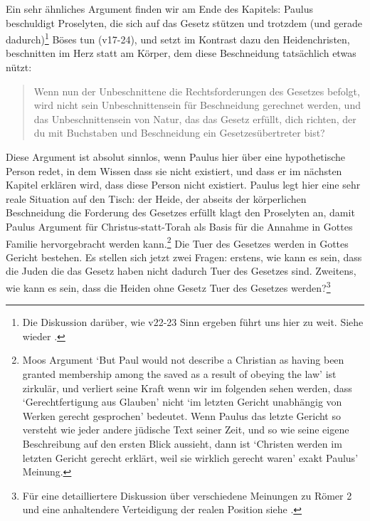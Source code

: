 Ein sehr ähnliches Argument finden wir am Ende des Kapitels:
Paulus beschuldigt Proselyten, die sich auf das Gesetz stützen und trotzdem (und gerade dadurch)\footnote{
	Die Diskussion darüber, wie v22-23 Sinn ergeben führt uns hier zu weit. Siehe wieder \Cite[S.59: Paul's So-Called Jew and Lawless Lawkeeping]{the-so-called-jew}.
}
Böses tun (v17-24), und setzt im Kontrast dazu den Heidenchristen, beschnitten im Herz statt am Körper,
dem diese Beschneidung tatsächlich etwas nützt:
\begin{quote}
	Wenn nun der Unbeschnittene die Rechtsforderungen des Gesetzes befolgt, wird nicht sein Unbeschnittensein für Beschneidung gerechnet werden,
	und das Unbeschnittensein von Natur, das das Gesetz erfüllt, dich richten, der du mit Buchstaben und Beschneidung ein Gesetzesübertreter bist?
\end{quote}
Diese Argument ist absolut sinnlos, wenn Paulus hier über eine hypothetische Person redet, in dem Wissen dass sie nicht existiert, und
dass er im nächsten Kapitel erklären wird, dass diese Person nicht existiert.
Paulus legt hier eine sehr reale Situation auf den Tisch: der Heide, der abseits der körperlichen Beschneidung die Forderung des Gesetzes erfüllt
klagt den Proselyten an, damit Paulus Argument für Christus-statt-Torah als Basis für die Annahme in Gottes Familie hervorgebracht werden kann.\footnote{
	Moos Argument `But Paul would not describe a Christian as having been granted membership among the saved as a result of obeying the law' \Cite{nicnt-romans}
	ist zirkulär, und verliert seine Kraft wenn wir im folgenden sehen werden, dass `Gerechtfertigung aus Glauben' nicht `im letzten Gericht unabhängig von Werken
	gerecht gesprochen' bedeutet.
	Wenn Paulus das letzte Gericht so versteht wie jeder andere jüdische Text seiner Zeit, und so wie seine eigene Beschreibung auf den ersten Blick aussieht,
	dann ist `Christen werden im letzten Gericht gerecht erklärt, weil sie wirklich gerecht waren' exakt Paulus' Meinung.
}
Die Tuer des Gesetzes werden in Gottes Gericht bestehen.
Es stellen sich jetzt zwei Fragen: erstens, wie kann es sein, dass die Juden die das Gesetz haben nicht dadurch Tuer des Gesetzes sind.
Zweitens, wie kann es sein, dass die Heiden ohne Gesetz Tuer des Gesetzes werden?\footnote{
	Für eine detailliertere Diskussion über verschiedene Meinungen zu Römer 2 und eine anhaltendere Verteidigung der realen Position
	siehe \Cite[215ff]{judgement-and-justification-in-early-judaism-and-the-apostle-paul}.
}

